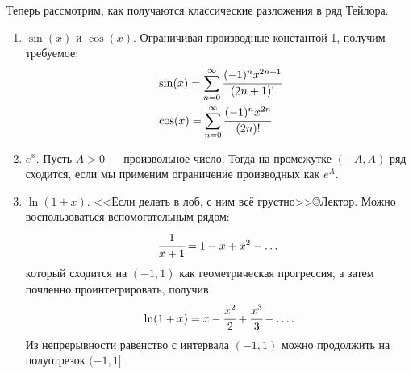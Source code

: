 \documentclass[a4paper, 12pt]{article}
\begin{document}
Теперь рассмотрим, как получаются классические разложения в ряд Тейлора.
\begin{enumerate}
    \item $\sin(x)$ и $\cos(x)$. Ограничивая производные константой 1, получим требуемое:
    \begin{align*}
        &\sin(x) = \sum\limits_{n=0}^{\infty} \cfrac{(-1)^n x^{2n+1}}{(2n+1)!}\\
        &\cos(x) = \sum\limits_{n=0}^{\infty} \cfrac{(-1)^n x^{2n}}{(2n)!}
    \end{align*}
    \item $e^x$. Пусть $A>0$ --- произвольное число. Тогда на промежутке $(-A, A)$ ряд сходится, если мы применим ограничение производных как $e^A$.
    \item $\ln(1+x)$. <<Если делать в лоб, с ним всё грустно>>\copyright Лектор. Можно воспользоваться вспомогательным рядом:
    \[
        \cfrac{1}{x+1} = 1 - x + x^2 - \ldots\\
    \]
    который сходится на $(-1, 1)$ как геометрическая прогрессия, а затем почленно проинтегрировать, получив
    \[
        \ln(1+x) = x - \cfrac{x^2}{2} + \cfrac{x^3}{3} - \ldots.
    \]
    Из непрерывности равенство с интервала $(-1, 1)$ можно продолжить на полуотрезок $(-1, 1]$.
\end{enumerate}
\end{document}
